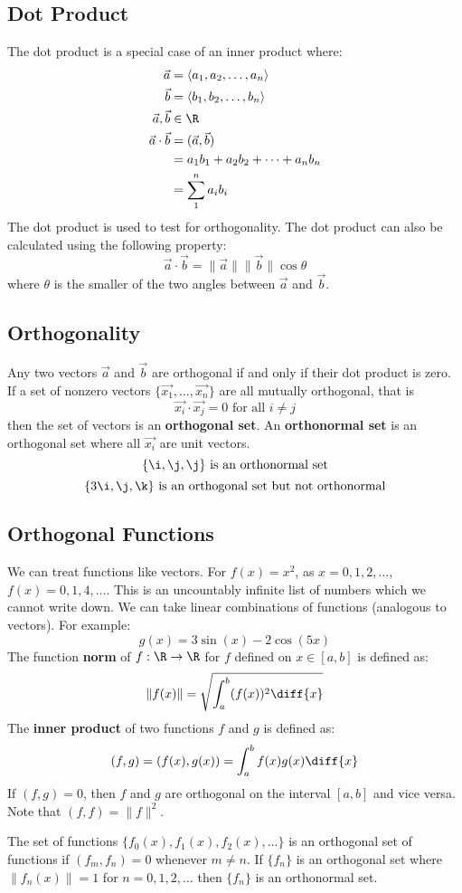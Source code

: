 \documentclass{math}
\begin{document}
\subsection*{Dot Product}
The dot product is a special case of an inner product where:
\begin{align*}
  \vec{a} &= \langle a_1,a_2,\dots,a_n \rangle \\
  \vec{b} &= \langle b_1,b_2,\dots,b_n \rangle \\
  \vec{a},\vec{b} &\in \R \\
  \vec{a}\cdot\vec{b} &= (\vec{a},\vec{b}) \\
  &= a_1b_1+a_2b_2+\dots+a_nb_n \\
  &= \sum_1^n{a_ib_i}
\end{align*}
The dot product is used to test for orthogonality. The dot product can also
be calculated using the following property:
\[ \vec{a}\cdot\vec{b} = \|\vec{a}\|\|\vec{b}\|\cos\theta \]
where \( \theta \) is the smaller of the two angles between \( \vec{a} \) and
\( \vec{b} \).

\subsection*{Orthogonality}
Any two vectors \( \vec{a} \) and \( \vec{b} \) are orthogonal if and only if
their dot product is zero. If a set of nonzero vectors
\( \{\vec{x_1},\dots,\vec{x_n}\} \) are all mutually orthogonal, that is
\[ \vec{x_i}\cdot\vec{x_j} = 0 \text{ for all } i\ne j \]
then the set of vectors is an \textbf{orthogonal set}. An \textbf{orthonormal
set} is an orthogonal set where all \( \vec{x_i} \) are unit vectors.
\[ \{\i,\j,\j\} \text{ is an orthonormal set} \]
\[ \{3\i,\j,\k\} \text{ is an orthogonal set but not orthonormal} \]

\subsection*{Orthogonal Functions}
We can treat functions like vectors. For \( f(x) = x^2 \), as
\( x = 0,1,2,\dots \), \( f(x) = 0,1,4,\dots \). This is an uncountably
infinite list of numbers which we cannot write down. We can take linear
combinations of functions (analogous to vectors). For example:
\[ g(x) = 3\sin(x)-2\cos(5x) \]
The function \textbf{norm} of \( f:\R\to\R \) for \( f \) defined on
\( x\in[a,b] \) is defined as:
\[ \|f(x)\| = \sqrt{\int_a^b(f(x))^2\diff{x}} \]
The \textbf{inner product} of two functions \( f \) and \( g \) is
defined as:
\[ (f,g) = (f(x),g(x)) = \int_a^bf(x)g(x)\diff{x} \]
If \( (f,g) = 0 \), then \( f \) and \( g \) are orthogonal on the interval
\( [a,b] \) and vice versa. Note that \( (f,f) = \|f\|^2 \). \par
The set of functions \( \{f_0(x),f_1(x),f_2(x),\dots\} \) is an orthogonal set
of functions if \( (f_m,f_n) = 0 \) whenever \( m\ne n \). If \( \{f_n\} \) is
an orthogonal set where \( \|f_n(x)\| = 1 \) for \( n = 0,1,2,\dots \) then
\( \{f_n\} \) is an orthonormal set.
\end{document}
